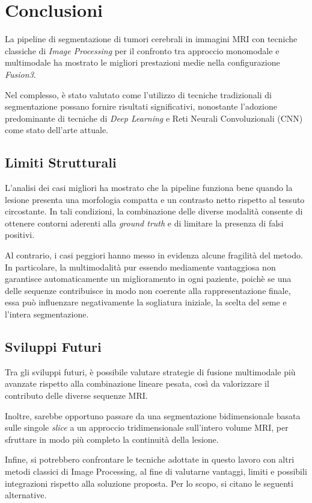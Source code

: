 \chapter{Conclusioni}
La pipeline di segmentazione di tumori cerebrali in immagini MRI con tecniche classiche di \textit{Image Processing} per il confronto tra approccio monomodale e multimodale ha mostrato le migliori prestazioni medie nella configurazione \textit{Fusion3}.

Nel complesso, è stato valutato come l'utilizzo di tecniche tradizionali di segmentazione possano fornire risultati significativi, nonostante l'adozione predominante di tecniche di \textit{Deep Learning} e Reti Neurali Convoluzionali (CNN) come stato dell'arte attuale.

\section{Limiti Strutturali}
L’analisi dei casi migliori ha mostrato che la pipeline funziona bene quando la lesione presenta una morfologia compatta e un contrasto netto rispetto al tessuto circostante. In tali condizioni, la combinazione delle diverse modalità consente di ottenere contorni aderenti alla \textit{ground truth} e di limitare la presenza di falsi positivi.

Al contrario, i casi peggiori hanno messo in evidenza alcune fragilità del metodo. In particolare, la multimodalità pur essendo mediamente vantaggiosa non garantisce automaticamente un miglioramento in ogni paziente, poichè se una delle sequenze contribuisce in modo non coerente alla rappresentazione finale, essa può influenzare negativamente la sogliatura iniziale, la scelta del seme e l’intera segmentazione.

\section{Sviluppi Futuri}
Tra gli sviluppi futuri, è possibile valutare strategie di fusione multimodale più avanzate rispetto alla combinazione lineare pesata, così da valorizzare il contributo delle diverse sequenze MRI.

Inoltre, sarebbe opportuno passare da una segmentazione bidimensionale basata sulle singole \textit{slice} a un approccio tridimensionale sull’intero volume MRI, per sfruttare in modo più completo la continuità della lesione.

Infine, si potrebbero confrontare le tecniche adottate in questo lavoro con altri metodi classici di Image Processing, al fine di valutarne vantaggi, limiti e possibili integrazioni rispetto alla soluzione proposta. Per lo scopo, si citano le seguenti alternative.

